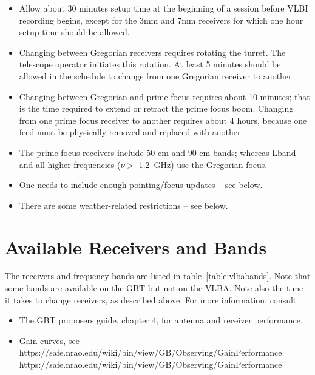 \begin{itemize}
\item Allow about 30 minutes setup time at the beginning of a session before
\gls{VLBI} recording begins, except for the 3mm and 7mm receivers for which one
hour setup time should be allowed.
 
\item Changing between Gregorian receivers requires rotating the turret.
      The telescope operator initiates this rotation.  At least 5 minutes
      should be allowed in the schedule to change from one Gregorian receiver to
      another.
        
\item  Changing between Gregorian and prime focus requires about 10 minutes;
       that is the time required to extend or retract the prime focus boom.  
       Changing from one prime focus receiver to another requires about 4
       hours, because one feed must be physically removed and replaced with
       another.

\item The prime focus receivers include 50 cm and 90 cm bands; 
      whereas \gls{Lband} and all higher frequencies ($\nu > $ 1.2~GHz)
      use the Gregorian focus.

\item One needs to include enough pointing/focus updates -- see below.
  
\item There are some weather-related restrictions -- see below.
  
\end{itemize}

\newpage

\section{Available Receivers and Bands}
The receivers and frequency bands are listed in table~\ref{table:vlbabands}. 
Note that some bands are available on the \gls{GBT} but not on the \gls{VLBA}.
Note also the time it takes to change receivers, as described above. For more
information, consult
\begin{itemize}
\item The GBT proposers guide, chapter 4, for antenna and receiver performance.
\item Gain curves, see \htmladdnormallink
{https://safe.nrao.edu/wiki/bin/view/GB/Observing/GainPerformance}
{https://safe.nrao.edu/wiki/bin/view/GB/Observing/GainPerformance}
\end{itemize}

